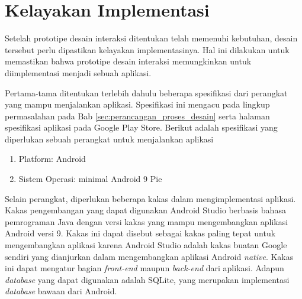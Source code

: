 \section{Kelayakan Implementasi}
\label{sec:kelayakan}

Setelah prototipe desain interaksi ditentukan telah memenuhi kebutuhan, desain tersebut perlu dipastikan kelayakan implementasinya. Hal ini dilakukan untuk memastikan bahwa prototipe desain interaksi memungkinkan untuk diimplementasi menjadi sebuah aplikasi.

Pertama-tama ditentukan terlebih dahulu beberapa spesifikasi dari perangkat yang mampu menjalankan aplikasi. Spesifikasi ini mengacu pada lingkup permasalahan pada Bab \ref{sec:perancangan_proses_desain} serta halaman spesifikasi aplikasi pada Google Play Store. Berikut adalah spesifikasi yang diperlukan sebuah perangkat untuk menjalankan aplikasi

\begin{enumerate}
  \item Platform: Android
  \item Sistem Operasi: minimal Android 9 Pie
\end{enumerate}

Selain perangkat, diperlukan beberapa kakas dalam mengimplementasi aplikasi. Kakas pengembangan yang dapat digunakan Android Studio berbasis bahasa pemrograman Java dengan versi kakas yang mampu mengembangkan aplikasi Android versi 9. Kakas ini dapat disebut sebagai kakas paling tepat untuk mengembangkan aplikasi karena Android Studio adalah kakas buatan Google sendiri yang dianjurkan dalam mengembangkan aplikasi Android \textit{native}. Kakas ini dapat mengatur bagian \textit{front-end} maupun \textit{back-end} dari aplikasi. Adapun \textit{database} yang dapat digunakan adalah SQLite, yang merupakan implementasi \textit{database} bawaan dari Android.

